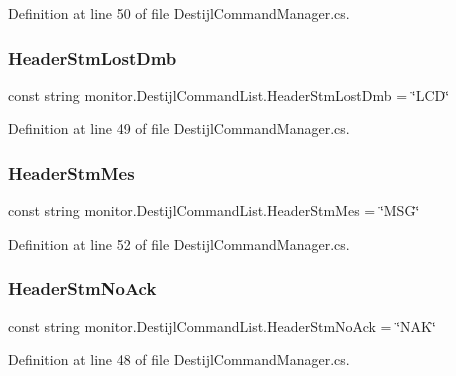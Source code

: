 Definition at line 50 of file Destijl\+Command\+Manager.\+cs.

\mbox{\label{classmonitor_1_1_destijl_command_list_a54e9ebd5e8f34ac596b84b56bb2403f7}} 
\subsubsection{Header\+Stm\+Lost\+Dmb}
{\footnotesize\ttfamily const string monitor.\+Destijl\+Command\+List.\+Header\+Stm\+Lost\+Dmb = \char`\"{}L\+CD\char`\"{}}



Definition at line 49 of file Destijl\+Command\+Manager.\+cs.

\mbox{\label{classmonitor_1_1_destijl_command_list_ad1fa4557b2d44dd888d8640f374c9f04}} 
\subsubsection{Header\+Stm\+Mes}
{\footnotesize\ttfamily const string monitor.\+Destijl\+Command\+List.\+Header\+Stm\+Mes = \char`\"{}M\+SG\char`\"{}}



Definition at line 52 of file Destijl\+Command\+Manager.\+cs.

\mbox{\label{classmonitor_1_1_destijl_command_list_ae3dc86c7e90bba409317e63cf1c85a39}} 
\subsubsection{Header\+Stm\+No\+Ack}
{\footnotesize\ttfamily const string monitor.\+Destijl\+Command\+List.\+Header\+Stm\+No\+Ack = \char`\"{}N\+AK\char`\"{}}



Definition at line 48 of file Destijl\+Command\+Manager.\+cs.

